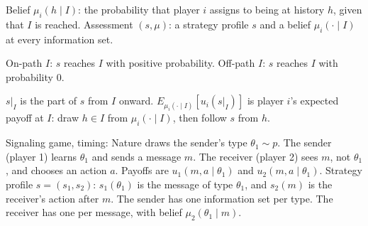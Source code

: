 \documentclass{article}
\begin{document}
Belief $\mu_i(h\mid I)$: the probability that player $i$ assigns to being at history $h$, given that $I$ is reached.
Assessment $(s,\mu)$: a strategy profile $s$ and a belief $\mu_i(\cdot\mid I)$ at every information set.

On-path $I$: $s$ reaches $I$ with positive probability. Off-path $I$: $s$ reaches $I$ with probability $0$.

$s\vert_I$ is the part of $s$ from $I$ onward.
$E_{\mu_i(\cdot\mid I)}[u_i(s\vert_I)]$ is player $i$'s expected payoff at $I$: draw $h\in I$ from $\mu_i(\cdot\mid I)$, then follow $s$ from $h$.

Signaling game, timing: Nature draws the sender's type $\theta_1\sim p$. The sender (player 1) learns $\theta_1$ and sends a message $m$. The receiver (player 2) sees $m$, not $\theta_1$, and chooses an action $a$. Payoffs are $u_1(m,a\mid\theta_1)$ and $u_2(m,a\mid\theta_1)$.
Strategy profile $s=(s_1,s_2)$: $s_1(\theta_1)$ is the message of type $\theta_1$, and $s_2(m)$ is the receiver's action after $m$.
The sender has one information set per type. The receiver has one per message, with belief $\mu_2(\theta_1\mid m)$.
\end{document}
